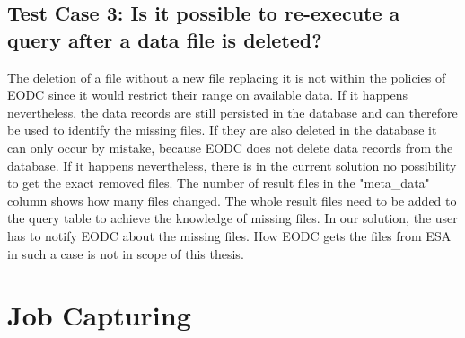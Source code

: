 \documentclass[draft,final]{vutinfth} %
\newcommand{\bgoesswein}[1]{{\color{blue}#1}}
\begin{document}
\subsection{Test Case 3: Is it possible to re-execute a query after a data file is deleted?}
The deletion of a file without a new file replacing it is not within the policies of EODC since it would restrict their range on available data. If it happens nevertheless, \bgoesswein{the data records are still persisted in the database and can therefore be used to identify the missing files. If they are also deleted in the database it can only occur by mistake, because EODC does not delete data records from the database. If it happens nevertheless,} there is in the current solution no possibility to get the exact removed files. The number of result files in the "meta\_data" column shows how many files changed. The whole result files need to be added to the query table to achieve the knowledge of missing files. In our solution, the user has to notify EODC about the missing files. How EODC gets the files from ESA in such a case is not in scope of this thesis. 




\section{Job Capturing}\label{Evaluation:special_jobcap}
\end{document}

